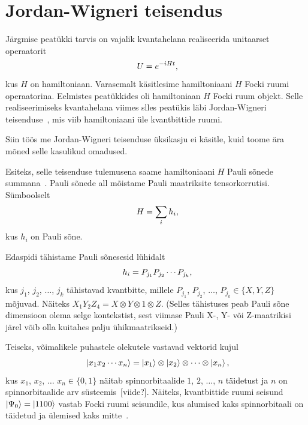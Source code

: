 \documentclass[12pt]{report}
\def\ket#1{\mathinner{|#1\rangle}}
\begin{document}
\section{Jordan-Wigneri teisendus}\label{sec:jw}

Järgmise peatükki tarvis on vajalik kvantahelana realiseerida unitaarset operaatorit
\begin{equation}\label{eq:hamtime}
  U = e^{-iHt}\rlap{,}
\end{equation}
kus \(H\) on hamiltoniaan.
Varasemalt käsitlesime hamiltoniaani \(H\) Focki ruumi operaatorina.
Eelmistes peatükkides oli hamiltoniaan \(H\) Focki ruum objekt.
Selle realiseerimiseks kvantahelana viimes slles peatükis läbi Jordan-Wigneri teisenduse~\cite{jordan+wigner}, mis viib hamiltoniaani üle kvantbittide ruumi.

Siin töös me Jordan-Wigneri teisenduse üksikasju ei käsitle, kuid toome ära mõned selle kasulikud omadused.

Esiteks, selle teisenduse tulemusena saame hamiltoniaani \(H\) Pauli sõnede summana~\cite{whitfield+etal}.
Pauli sõnede all mõistame Pauli maatriksite tensorkorrutisi.
Sümboolselt
\begin{equation}\label{eq:paulisum} H = \sum_i h_i\rlap{,} \end{equation}
kus $h_i$ on Pauli sõne.

Edaspidi tähistame Pauli sõnesesid lühidalt
\begin{equation} h_i=P_{j_1}P_{j_2}\cdots P_{j_k} \rlap{,}\end{equation}
kus \(j_1\), \(j_2\), $\ldots$, \(j_k\) tähistavad kvantbitte, millele \(P_{j_1}\), \(P_{j_2}\), \(\ldots\), \(P_{j_k}\in\{X,Y,Z\}\) mõjuvad.
Näiteks \(X_1Y_2Z_4=X\otimes Y\otimes 1\otimes Z.\)
(Selles tähistuses peab Pauli sõne dimensioon olema selge kontekstist, sest viimase Pauli X-, Y- või Z-maatrikisi järel võib olla kuitahes palju ühikmaatrikseid.)

Teiseks, võimalikele puhastele olekutele vastavad vektorid kujul
\begin{equation}
  \ket{x_1x_2\cdots x_n}
     = \ket{x_1}\otimes\ket{x_2}\otimes\cdots\otimes\ket{x_n}\rlap{,}
\end{equation}
kus $x_1$, $x_2$, $\ldots$ $x_n\in\{0,1\}$ näitab spinnorbitaalide $1$, $2$, $\ldots$, $n$ täidetust ja $n$ on spinnorbitaalide arv süsteemis~[viide?].
Näiteks, kvantbittide ruumi seisund \(\ket{\Psi_0}=\ket{1100}\) vastab Focki ruumi seisundile, kus alumised kaks spinnorbitaali on täidetud ja ülemised kaks mitte~\cite{szabo+ostlund, mcardle+etal}.
\end{document}
